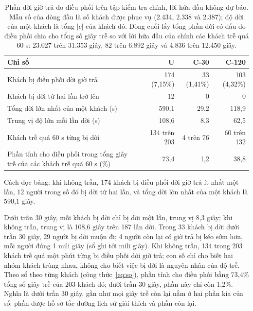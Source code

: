 \begin{table}[htbp]
\centering
\caption{Phần dời giờ trả do điều phối trên tập kiểm tra chính, lời hứa đầu không dự báo. Mẫu số của
dòng đầu là số khách được phục vụ (2.434, 2.338 và 2.387); độ dời của một khách là tổng $|c|$ của khách
đó. Dòng cuối lấy tổng phần dời có dấu do điều phối chia cho tổng số giây trễ so với lời hứa đầu của chính các khách
trễ quá 60 s: 23.027 trên 31.353 giây, 82 trên 6.892 giây và 4.836 trên 12.450 giây.}
\label{bang:c4-doidieuphoi}
\small
\begin{tabular}{@{}p{7.6cm}rrr@{}}
\toprule
\textbf{Chỉ số} & \textbf{U} & \textbf{C-30} & \textbf{C-120}\\
\midrule
Khách bị điều phối dời giờ trả & 174 (7,15\%) & 33 (1,41\%) & 103 (4,32\%)\\
Khách bị dời từ hai lần trở lên & 12 & 0 & 0\\
Tổng dời lớn nhất của một khách (s) & 590,1 & 29,2 & 118,9\\
Trung vị độ lớn mỗi lần dời (s) & 108,6 & 8,3 & 62,5\\
Khách trễ quá 60 s từng bị dời & 134 trên 203 & 4 trên 76 & 60 trên 132\\
Phần tính cho điều phối trong tổng giây trễ của các khách trễ quá 60 s (\%) & 73,4 & 1,2 & 38,8\\
\bottomrule
\end{tabular}
\end{table}

Cách đọc bảng: khi không trần, 174 khách bị điều phối dời giờ trả ít nhất một lần, 12 người trong số đó bị dời từ
hai lần, và tổng dời lớn nhất của một khách là 590,1 giây.

Dưới trần 30 giây, mỗi khách bị dời chỉ bị dời một lần, trung vị 8,3 giây; khi không trần, trung vị là 108,6 giây
trên 187 lần dời. Trong 33 khách bị dời dưới trần 30 giây, 29 người bị dời muộn đi; 4 người còn lại có giờ trả bị kéo
sớm hơn, mỗi người đúng 1 mili giây (sổ ghi tới mili giây). Khi không trần, 134 trong 203 khách trễ quá một phút từng
bị điều phối dời giờ trả; con số chỉ cho biết hai nhóm khách trùng nhau, không cho biết việc bị dời là nguyên nhân của
độ trễ. Theo sổ theo từng khách (công thức~\eqref{eq:so}), phần tính cho điều phối bằng 73,4\% tổng số giây trễ của
203 khách đó; dưới trần 30 giây, phần này chỉ còn 1,2\%. Nghĩa là dưới trần 30 giây, gần như mọi giây trễ còn lại
nằm ở hai phần kia của sổ: phần được hồ sơ tắc đường lịch sử giải thích và phần còn lại.

